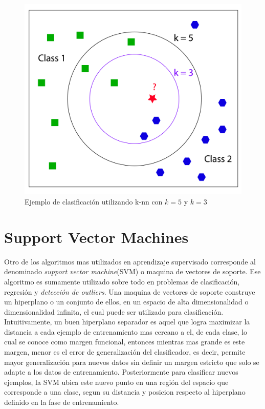 \begin{figure}[ht!]
\centering
\includegraphics[width=.6\textwidth]{figures/knn.png}
\caption[abs]{Ejemplo de clasificación utilizando k-nn con $k=5$ y $k=3$}
\label{fig:knn}
\end{figure}

\section{Support Vector Machines}

Otro de los algoritmos mas utilizados en aprendizaje supervisado corresponde al denominado \textit{support vector machine}(SVM) o maquina de vectores de soporte. Ese algoritmo es sumamente utilizado sobre todo en problemas de clasificación, regresión y \textit{detección de outliers}. Una maquina de vectores de soporte construye un hiperplano o un conjunto de ellos, en un espacio de alta dimensionalidad o dimensionalidad infinita, el cual puede ser utilizado para clasificación. Intuitivamente, un buen hiperplano separador es aquel que logra maximizar la distancia a cada ejemplo de entrenamiento mas cercano a el, de cada clase, lo cual se conoce como margen funcional, entonces mientras mas grande es este margen, menor es el error de generalización del clasificador, es decir, permite mayor generalización para nuevos datos sin definir un margen estricto que solo se adapte a los datos de entrenamiento. Posteriormente para clasificar nuevos ejemplos, la SVM ubica este nuevo punto en una región del espacio que corresponde a una clase, segun su distancia y posicion respecto al hiperplano definido en la fase de entrenamiento.

